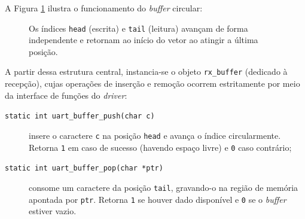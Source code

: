 A Figura \ref{fig:ring-buffer} ilustra o funcionamento do \textit{buffer} circular:

\begin{figure}[htbp]
    \centering
    \caption{Os índices \texttt{head} (escrita) e \texttt{tail} (leitura) avançam de forma independente e retornam ao início do vetor ao atingir a última posição.}
    \label{fig:ring-buffer}
\end{figure}

A partir dessa estrutura central, instancia-se o objeto \texttt{rx\_buffer} (dedicado à recepção), cujas operações de inserção e remoção ocorrem estritamente por meio da interface de funções do \textit{driver}:

\begin{description}
    \item[\texttt{static int uart\_buffer\_push(char c)}] insere o caractere \texttt{c} na posição \texttt{head} e avança o índice circularmente. Retorna \texttt{1} em caso de sucesso (havendo espaço livre) e \texttt{0} caso contrário;
    \item[\texttt{static int uart\_buffer\_pop(char *ptr)}] consome um caractere da posição \texttt{tail}, gravando-o na região de memória apontada por \texttt{ptr}. Retorna \texttt{1} se houver dado disponível e \texttt{0} se o \textit{buffer} estiver vazio.
\end{description}

